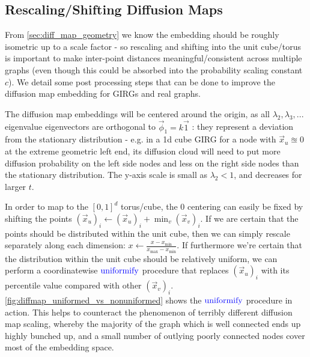 \subsection{Rescaling/Shifting Diffusion Maps}
From \cref{sec:diff_map_geometry} we know the embedding should be roughly isometric up to a scale factor - so rescaling and shifting into the unit cube/torus is important to make inter-point distances meaningful/consistent across multiple graphs (even though this could be absorbed into the probability scaling constant $c$). We detail some post processing steps that can be done to improve the diffusion map embedding for GIRGs and real graphs.


The diffusion map embeddings will be centered around the origin, as all $\lambda_2, \lambda_3, ...$ eigenvalue eigenvectors are orthogonal to $\vec{\phi}_1 = k \vec{1}$ : they represent a deviation from the stationary distribution - e.g. in a 1d cube GIRG for a node with $\vec{x}_u \approxeq 0$ at the extreme geometric left end, its diffusion cloud will need to put more diffusion probability on the left side nodes and less on the right side nodes than the stationary distribution. The y-axis scale is small as $\lambda_2 < 1$, and decreases for larger $t$.


In order to map to the $[0, 1]^d$ torus/cube, the 0 centering can easily be fixed by shifting the points $(\vec{x}_u)_i \gets (\vec{x}_u)_i + \min_v (\vec{x}_v)_i$.
If we are certain that the points should be distributed within the unit cube, then we can simply rescale separately along each dimension: $x \gets \frac{x - x_{\min}}{x_{\max} - x_{\min}}$.
If furthermore we're certain that the distribution within the unit cube should be relatively uniform, we can perform a coordinatewise $\operatorname{\textcolor{blue}{uniformify}}$ procedure that replaces $(\vec{x}_u)_i$ with its percentile value compared with other $(\vec{x}_v)_i$. \cref{fig:diffmap_uniformed_vs_nonuniformed} shows the $\operatorname{\textcolor{blue}{uniformify}}$ procedure in action. This helps to counteract the phenomenon of terribly different diffusion map scaling, whereby the majority of the graph which is well connected ends up highly bunched up, and a small number of outlying poorly connected nodes cover most of the embedding space. 


